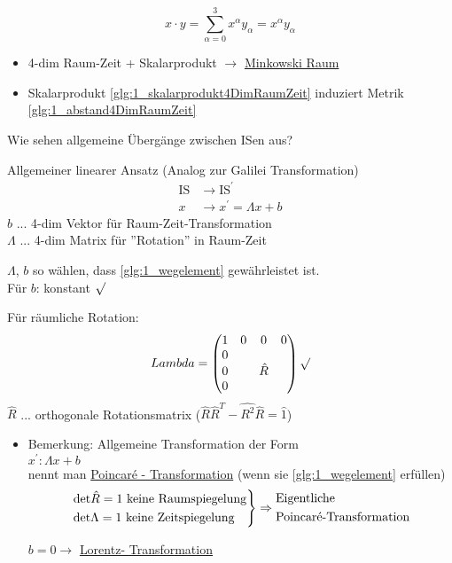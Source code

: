 \documentclass[a4paper, 11pt]{article}
\numberwithin{equation}{section}
\begin{document}
\begin{equation}
x \cdot y = \sum^3_{\alpha = 0} x^\alpha y_\alpha = x^\alpha y_\alpha
\end{equation}

\begin{itemize}
\item 4-dim Raum-Zeit + Skalarprodukt $\rightarrow$ \underline{Minkowski Raum}
\item Skalarprodukt \ref{glg:1_skalarprodukt4DimRaumZeit} induziert Metrik \ref{glg:1_abstand4DimRaumZeit}
\end{itemize}


Wie sehen allgemeine Übergänge zwischen ISen aus?

Allgemeiner linearer Ansatz (Analog zur Galilei Transformation)
\begin{equation}
\begin{aligned}
\text{IS} &\rightarrow \text{IS}^\prime\\
x &\rightarrow x^\prime = \Lambda x + b
\end{aligned}
\end{equation}
$b$ ... 4-dim Vektor für Raum-Zeit-Transformation\\
$\Lambda$ ... 4-dim Matrix für ''Rotation'' in Raum-Zeit

$\Lambda$, $b$ so wählen, dass \ref{glg:1_wegelement} gewährleistet ist.\\
Für $b$: konstant $\surd$ 

Für räumliche Rotation:
\begin{equation}
Lambda = \begin{pmatrix}
1 & 0& 0& 0 \\
0 \\
0 & & \hat{R} \\
0
\end{pmatrix} \surd
\end{equation}
$\hat{R}$ ... orthogonale Rotationsmatrix ($\hat{R}\hat{R}^T- \hat{R^2} \hat{R} = \hat{1}$)

\begin{itemize}
\item Bemerkung: Allgemeine Transformation der Form\\
$x^\prime: \Lambda x + b$\\
nennt man \underline{Poincaré - Transformation} (wenn sie \ref{glg:1_wegelement} erfüllen)
\begin{equation*}
\begin{rcases*}
\text{det}\hat{R} = 1 \text{ keine Raumspiegelung} \\
\text{det}\Lambda = 1 \text{ keine Zeitspiegelung} 
\end{rcases*} \Rightarrow
\begin{aligned}
 &\text{Eigentliche } \\ &\text{Poincaré-Transformation}
\end{aligned}
\end{equation*}


$b=0 \rightarrow$ \underline{Lorentz- Transformation}
\end{itemize}
\end{document}
